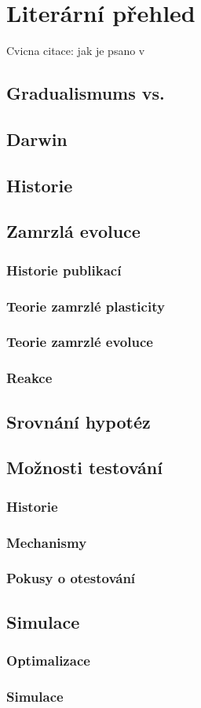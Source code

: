 \chapter{Literární přehled}

Cvicna citace: jak je psano v~\citet{Lamport1994}



\section{Gradualismums vs.}

\section{Darwin}

\section{Historie}

\section{Zamrzlá evoluce}
\subsection{Historie publikací}
\subsection{Teorie zamrzlé plasticity}
\subsection{Teorie zamrzlé evoluce}
\subsection{Reakce}

\section{Srovnání hypotéz}

\section{Možnosti testování}
\subsection{Historie}
\subsection{Mechanismy}
\subsection{Pokusy o otestování}

\section{Simulace}
\subsection{Optimalizace}
\subsection{Simulace}
